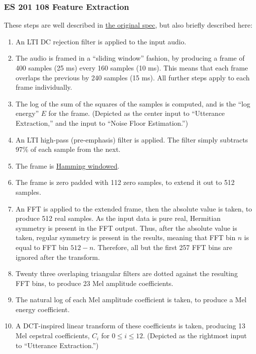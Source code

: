 \documentclass{article}
\begin{document}
\subsubsection{ES 201 108 Feature Extraction}
These steps are well described in \href{http://www.etsi.org/deliver/etsi_es/201100_201199/201108/01.01.02_60/es_201108v010102p.pdf}{the original spec}, but also briefly described here:
\renewcommand{\labelenumi}{\textbf{\Roman{enumi}.}}%
\begin{enumerate}
\item An LTI DC rejection filter is applied to the input audio.
\item The audio is framed in a ``sliding window'' fashion, by producing a frame of 400 samples (25 ms) every 160 samples (10 ms).
This means that each frame overlaps the previous by 240 samples (15 ms).
All further steps apply to each frame individually.
\item The log of the sum of the squares of the samples is computed, and is the ``log energy'' $E$ for the frame. (Depicted as the center input to ``Utterance Extraction,'' and the input to ``Noise Floor Estimation.'')
\item An LTI high-pass (pre-emphasis) filter is applied. The filter simply subtracts 97\% of each sample from the next.
\item The frame is \href{http://en.wikipedia.org/wiki/Window_function#Hamming_window}{Hamming windowed}.
\item The frame is zero padded with 112 zero samples, to extend it out to 512 samples.
\item An FFT is applied to the extended frame, then the absolute value is taken, to produce 512 real samples.
As the input data is pure real, Hermitian symmetry is present in the FFT output.
Thus, after the absolute value is taken, regular symmetry is present in the results, meaning that FFT bin $n$ is equal to FFT bin $512 - n$.
Therefore, all but the first 257 FFT bins are ignored after the transform.
\item Twenty three overlaping triangular filters are dotted against the resulting FFT bins, to produce 23 Mel amplitude coefficients.
\item The natural log of each Mel amplitude coefficient is taken, to produce a Mel energy coefficient.
\item A DCT-inspired linear transform of these coefficients is taken, producing 13 Mel cepstral coefficients, $C_i$ for $0 \le i \le 12$. (Depicted as the rightmost input to ``Utterance Extraction.'')
\end{enumerate}
\end{document}
